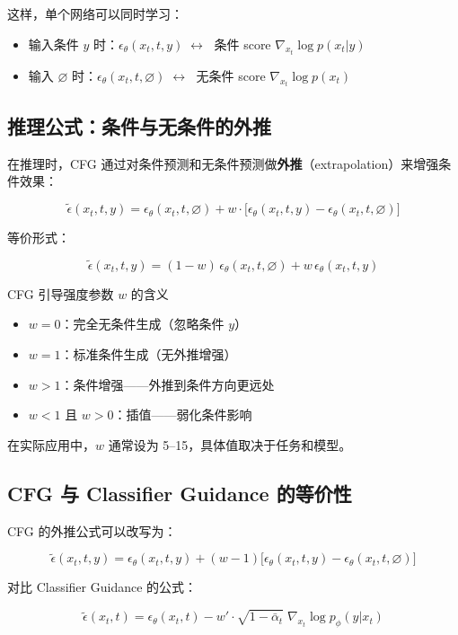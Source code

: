 \documentclass[a4paper]{article}
\begin{document}
这样，单个网络可以同时学习：
\begin{itemize}
    \item 输入条件 $y$ 时：$\epsilon_\theta(x_t, t, y) \;\longleftrightarrow\;$ 条件 score $\nabla_{x_t}\log p(x_t|y)$
    \item 输入 $\varnothing$ 时：$\epsilon_\theta(x_t, t, \varnothing) \;\longleftrightarrow\;$ 无条件 score $\nabla_{x_t}\log p(x_t)$
\end{itemize}

\subsection{推理公式：条件与无条件的外推}

在推理时，CFG 通过对条件预测和无条件预测做\textbf{外推}（extrapolation）来增强条件效果：

$$
\tilde{\epsilon}(x_t, t, y) = \epsilon_\theta(x_t, t, \varnothing) + w \cdot \bigl[\epsilon_\theta(x_t, t, y) - \epsilon_\theta(x_t, t, \varnothing)\bigr]
$$

等价形式：

$$
\tilde{\epsilon}(x_t, t, y) = (1-w)\,\epsilon_\theta(x_t, t, \varnothing) + w\,\epsilon_\theta(x_t, t, y)
$$

\begin{importantbox}{CFG 引导强度参数 $w$ 的含义}
\begin{itemize}
    \item $w = 0$：完全无条件生成（忽略条件 $y$）
    \item $w = 1$：标准条件生成（无外推增强）
    \item $w > 1$：条件增强——外推到条件方向更远处
    \item $w < 1$ 且 $w > 0$：插值——弱化条件影响
\end{itemize}
在实际应用中，$w$ 通常设为 5--15，具体值取决于任务和模型。
\end{importantbox}

\subsection{CFG 与 Classifier Guidance 的等价性}

CFG 的外推公式可以改写为：

$$
\tilde{\epsilon}(x_t, t, y) = \epsilon_\theta(x_t, t, y) + (w-1)\bigl[\epsilon_\theta(x_t, t, y) - \epsilon_\theta(x_t, t, \varnothing)\bigr]
$$

对比 Classifier Guidance 的公式：

$$
\tilde{\epsilon}(x_t, t) = \epsilon_\theta(x_t, t) - w'\cdot\sqrt{1-\bar\alpha_t}\;\nabla_{x_t}\log p_\phi(y|x_t)
$$
\end{document}
